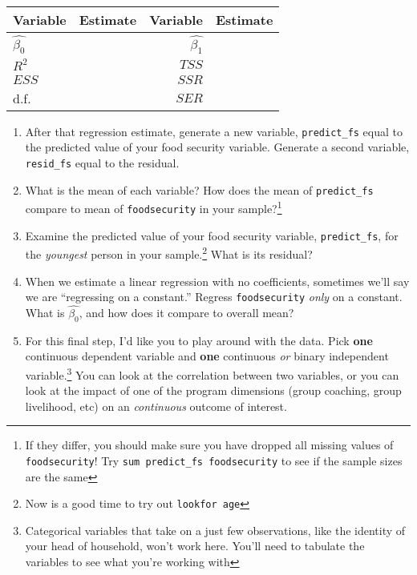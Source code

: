 \documentclass[11pt]{article}
\begin{document}
\begin{longtable}[]{@{}lrrr@{}}
\toprule
Variable & Estimate & Variable & Estimate \\
\midrule
\endhead
\(\hat{\beta_0}\) & & \(\hat{\beta_1}\) & \\
\(R^2\) & & \(TSS\) & \\
\(ESS\) & & \(SSR\) & \\
d.f. & & \(SER\) & \\
\bottomrule
\end{longtable}

\begin{enumerate}
\def\labelenumi{\arabic{enumi}.}
\setcounter{enumi}{8}
\item
  After that regression estimate, generate a new variable,
  \texttt{predict\_fs} equal to the predicted value of your food
  security variable. Generate a second variable, \texttt{resid\_fs}
  equal to the residual.
\item
  What is the mean of each variable? How does the mean of
  \texttt{predict\_fs} compare to mean of \texttt{foodsecurity} in your
  sample?\footnote{If they differ, you should make sure you have dropped
    all missing values of \texttt{foodsecurity}! Try
    \texttt{sum\ predict\_fs\ foodsecurity} to see if the sample sizes
    are the same}
\item
  Examine the predicted value of your food security variable,
  \texttt{predict\_fs}, for the \emph{youngest} person in your
  sample.\footnote{Now is a good time to try out \texttt{lookfor\ age}}
  What is its residual?
\item
  When we estimate a linear regression with no coefficients, sometimes
  we'll say we are ``regressing on a constant.'' Regress
  \texttt{foodsecurity} \emph{only} on a constant. What is
  \(\hat{\beta_0}\), and how does it compare to overall mean?
\item
  For this final step, I'd like you to play around with the data. Pick
  \textbf{one} continuous dependent variable and \textbf{one} continuous
  \emph{or} binary independent variable.\footnote{Categorical variables
    that take on a just few observations, like the identity of your head
    of household, won't work here. You'll need to tabulate the variables
    to see what you're working with} You can look at the correlation
  between two variables, or you can look at the impact of one of the
  program dimensions (group coaching, group livelihood, etc) on an
  \emph{continuous} outcome of interest.


\end{enumerate}
\end{document}
